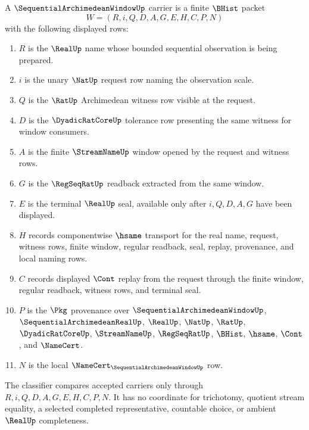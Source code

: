 \begin{definition}
\label{def:sequential-archimedean-window-carrier}
A $\SequentialArchimedeanWindowUp$ carrier is a finite $\BHist$ packet
$$
W=(R,i,Q,D,A,G,E,H,C,P,N)
$$
with the following displayed rows:
\begin{enumerate}
\item $R$ is the $\RealUp$ name whose bounded sequential observation is being prepared.
\item $i$ is the unary $\NatUp$ request row naming the observation scale.
\item $Q$ is the $\RatUp$ Archimedean witness row visible at the request.
\item $D$ is the $\DyadicRatCoreUp$ tolerance row presenting the same witness for window consumers.
\item $A$ is the finite $\StreamNameUp$ window opened by the request and witness rows.
\item $G$ is the $\RegSeqRatUp$ readback extracted from the same window.
\item $E$ is the terminal $\RealUp$ seal, available only after $i,Q,D,A,G$ have been displayed.
\item $H$ records componentwise $\hsame$ transport for the real name, request, witness rows, finite window, regular readback, seal, replay, provenance, and local naming rows.
\item $C$ records displayed $\Cont$ replay from the request through the finite window, regular readback, witness rows, and terminal seal.
\item $P$ is the $\Pkg$ provenance over $\SequentialArchimedeanWindowUp$, $\SequentialArchimedeanRealUp$, $\RealUp$, $\NatUp$, $\RatUp$, $\DyadicRatCoreUp$, $\StreamNameUp$, $\RegSeqRatUp$, $\BHist$, $\hsame$, $\Cont$, and $\NameCert$.
\item $N$ is the local $\NameCert_{\SequentialArchimedeanWindowUp}$ row.
\end{enumerate}
The classifier compares accepted carriers only through $R,i,Q,D,A,G,E,H,C,P,N$. It has no coordinate for trichotomy, quotient stream equality, a selected completed representative, countable choice, or ambient $\RealUp$ completeness.
\end{definition}

